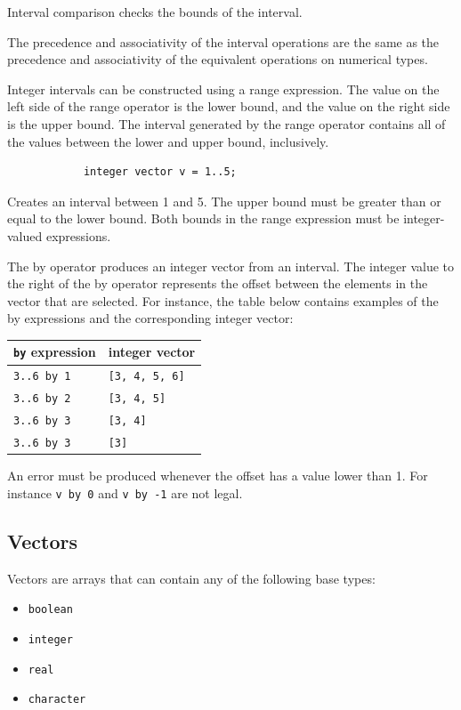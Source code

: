 \documentclass{article}
\begin{document}
		Interval comparison checks the bounds of the interval.

		The precedence and associativity of the interval operations are the same as the precedence and associativity of
		the equivalent operations on numerical types.

		Integer intervals can be constructed using a range expression. The value on the left side of the range operator
		is the lower bound, and the value on the right side is the upper bound. The interval generated by the range
		operator contains all of the values between the lower and upper bound, inclusively.

		\begin{lstlisting}
			integer vector v = 1..5;
		\end{lstlisting}

		Creates an interval between 1 and 5. The upper bound must be greater than or equal to the lower bound. Both
		bounds in the range expression must be integer-valued expressions.

		The by operator produces an integer vector from an interval. The integer value to the right of the by operator
		represents the offset between the elements in the vector that are selected. For instance, the table below
		contains examples of the by expressions and the corresponding integer vector:

		\begin{center}
			\begin{tabular}{|l|l|}
			\hline
			\textbf{\texttt{by} expression} & \textbf{integer vector} \\
			\hline
			\texttt{3..6 by 1} & \texttt{[3, 4, 5, 6]} \\
			\texttt{3..6 by 2} & \texttt{[3, 4, 5]}    \\
			\texttt{3..6 by 3} & \texttt{[3, 4]}       \\
			\texttt{3..6 by 3} & \texttt{[3]}          \\
			\hline
			\end{tabular}
		\end{center}

		An error must be produced whenever the offset has a value lower than 1. For instance \texttt{v by 0} and
		\texttt{v by -1} are not legal.


	\subsection{Vectors}\label{sec:vector}

		Vectors are arrays that can contain any of the following base types:
		\begin{itemize}
			\item \texttt{boolean}
			\item \texttt{integer}
			\item \texttt{real}
			\item \texttt{character}
		\end{itemize}
\end{document}
